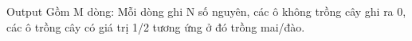 Output
Gồm M dòng: Mỗi dòng ghi N số nguyên, các ô không trồng cây ghi ra 0, các ô trồng cây có giá trị 1/2 tương ứng ở đó trồng mai/đào.